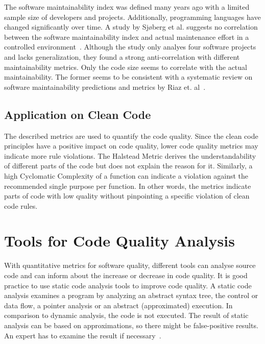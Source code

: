 The software maintainability index was defined many years ago with a limited sample size of developers and projects. Additionally, programming languages have changed significantly over time. A study by Sjøberg et al. suggests no correlation between the software maintainability index and actual maintenance effort in a controlled environment~\cite{sjoberg_questioning_nodate}. Although the study only analyes four software projects and lacks generalization, they found a strong anti-correlation with different maintainability metrics. Only the code size seems to correlate with the actual maintainability. The former seems to be consistent with a systematic review on software maintainability predictions and metrics by Riaz et. al~\cite{riaz_systematic_2009}.

\subsection{Application on Clean Code}
The described metrics are used to quantify the code quality. Since the clean code principles have a positive impact on code quality, lower code quality metrics may indicate more rule violations. The Halstead Metric derives the understandability of different parts of the code but does not explain the reason for it. Similarly, a high Cyclomatic Complexity of a function can indicate a violation against the recommended single purpose per function. In other words, the metrics indicate parts of code with low quality without pinpointing a specific violation of clean code rules. 


\section{Tools for Code Quality Analysis}\label{sec:tool_comparison}
With quantitative metrics for software quality, different tools can analyse source code and can inform about the increase or decrease in code quality. It is good practice to use static code analysis tools to improve code quality. A static code analysis examines a program by analyzing an abstract syntax tree, the control or data flow, a pointer analysis or an abstract (approximated) execution. In comparison to dynamic analysis, the code is not executed. The result of static analysis can be based on approximations, so there might be false-positive results. An expert has to examine the result if necessary~\cite{prahofer_static_2017}.

